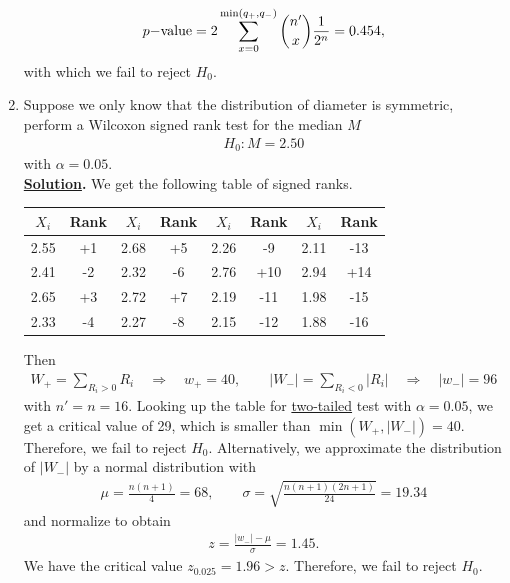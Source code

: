 \begin{enumerate}
	\begin{align*}
	p\mathrm{-value} = 2\sum_{x=0}^{\min(q_+, q_-)} \binom{n'}{x} \frac{1}{2^n} = 0.454,
	\end{align*}
	with which we fail to reject $H_0$.
	\item Suppose we only know that the distribution of diameter is symmetric, perform a Wilcoxon signed rank test for the median $M$
	\begin{align*}
	H_0: M = 2.50
	\end{align*}
	with $\alpha = 0.05$. \\
	\textbf{\underline{Solution}.} We get the following table of signed ranks.
	\begin{table}[H]
		\centering
		\begin{tabular}{cc|cc|cc|cc}
			\hline
			$X_i$ & Rank & $X_i$ & Rank & $X_i$ & Rank & $X_i$ & Rank \\
			\hline
			2.55 & +1 & 2.68 & +5 & 2.26 & -9 & 2.11 & -13 \\
			2.41 & -2 & 2.32 & -6 & 2.76 & +10 & 2.94 & +14 \\
			2.65 & +3 & 2.72 & +7 & 2.19 & -11 & 1.98 & -15 \\
			2.33 & -4 & 2.27 & -8 & 2.15 & -12 & 1.88 & -16 \\
			\hline
		\end{tabular}
	\end{table}
	Then
	\begin{align*}
	W_+ = \sum_{R_i > 0} R_i\quad\Rightarrow\quad w_+ = 40, \qquad |W_-| = \sum_{R_i < 0} |R_i| \quad\Rightarrow\quad |w_-| = 96
	\end{align*}
	with $n' = n = 16$. Looking up the table for \underline{two-tailed} test with $\alpha=0.05$, we get a critical value of 29, which is smaller than $\min(W_+, |W_-|) = 40$. Therefore, we fail to reject $H_0$. Alternatively, we approximate the distribution of $|W_-|$ by a normal distribution with
	\begin{align*}
	\mu = \frac{n(n+1)}{4} = 68, \qquad \sigma = \sqrt{\frac{n(n+1)(2n+1)}{24}} = 19.34
	\end{align*}
	and normalize to obtain
	\begin{align*}
	z = \frac{|w_-| - \mu}{\sigma} = 1.45.
	\end{align*}
	We have the critical value $z_{0.025} = 1.96 > z$. Therefore, we fail to reject $H_0$.
	\begin{figure}[H]
		\centering

\end{figure}
\end{enumerate}
